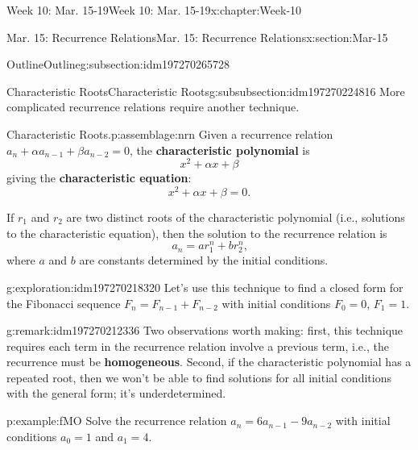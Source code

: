 \documentclass[oneside,10pt,]{book}
\newcommand{\terminology}[1]{\textbf{#1}}
\numberwithin{equation}{section}
\begin{document}
\begin{chapterptx}{Week 10: Mar. 15-19}{}{Week 10: Mar. 15-19}{}{}{x:chapter:Week-10}
\begin{sectionptx}{Mar. 15: Recurrence Relations}{}{Mar. 15: Recurrence Relations}{}{}{x:section:Mar-15}
\begin{subsectionptx}{Outline}{}{Outline}{}{}{g:subsection:idm197270265728}
%
%
\typeout{************************************************}
\typeout{************************************************}
%
\begin{subsubsectionptx}{Characteristic Roots}{}{Characteristic Roots}{}{}{g:subsubsection:idm197270224816}
More complicated recurrence relations require another technique.%
\begin{assemblage}{Characteristic Roots.}{p:assemblage:nrn}%
 Given a recurrence relation \(a_n + \alpha a_{n-1} + \beta a_{n-2} = 0\), the \terminology{characteristic polynomial} is %
\begin{equation*}
x^2 + \alpha x + \beta
\end{equation*}
giving the \terminology{characteristic equation}: %
\begin{equation*}
x^2 + \alpha x + \beta = 0\text{.}
\end{equation*}
%
\par
{} If \(r_1\) and \(r_2\) are two distinct roots of the characteristic polynomial (i.e., solutions to the characteristic equation), then the solution to the recurrence relation is%
\begin{equation*}
a_n = ar_1^n + br_2^n\text{,}
\end{equation*}
where \(a\) and \(b\) are constants determined by the initial conditions.%
\end{assemblage}
\begin{exploration}{}{g:exploration:idm197270218320}%
Let's use this technique to find a closed form for the Fibonacci sequence \(F_n = F_{n-1} + F_{n-2}\) with initial conditions \(F_0 = 0\), \(F_1 = 1\).%
\end{exploration}%
\begin{remark}{}{g:remark:idm197270212336}%
Two observations worth making: first, this technique requires each term in the recurrence relation involve a previous term, i.e., the recurrence must be \terminology{homogeneous}. Second, if the characteristic polynomial has a repeated root, then we won't be able to find solutions for all initial conditions with the general form; it's underdetermined.%
\end{remark}
\begin{example}{}{p:example:fMO}%
Solve the recurrence relation \(a_n = 6a_{n-1} - 9a_{n-2}\) with initial conditions \(a_0 = 1\) and \(a_1 = 4\).%
\par\smallskip%

\end{example}
\end{subsubsectionptx}
\end{subsectionptx}
\end{sectionptx}
\end{chapterptx}
\end{document}
